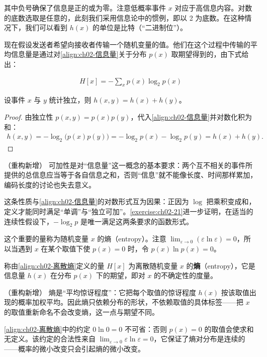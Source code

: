 \documentclass[../../main.tex]{subfiles}
\begin{document}
其中负号确保了信息是正的或为零。注意低概率事件 $x$ 对应于高信息内容。对数的底数选取是任意的，此刻我们采用信息论中的惯例，即以 2 为底数。在这种情况下，我们可以看到 $h(x)$ 的单位是比特（“二进制位”）。

现在假设发送者希望向接收者传输一个随机变量的值。他们在这个过程中传输的平均信息量是通过对\eqref{align:ch02-信息量}关于分布 $p(x)$ 取期望得到的，由下式给出：

\begin{align}
  H[x] = -\sum_{x} p(x)\log_2 p(x)
  \label{align:ch02-离散熵}
\end{align}

\begin{proposition}[独立事件的信息量可加]\label{proposition:ch02-信息量可加}
设事件 $x$ 与 $y$ 统计独立，则 $h(x,y)=h(x)+h(y)$。
\end{proposition}

\begin{proof}
由独立性 $p(x,y)=p(x)p(y)$，代入\eqref{align:ch02-信息量}并对数化积为和：
\begin{align*}
  h(x,y) = -\log_2\big(p(x)p(y)\big) = -\log_2p(x) - \log_2p(y) = h(x)+h(y) .
\end{align*}
\end{proof}

\begin{remark}（重构新增）
可加性是对“信息量”这一概念的基本要求：两个互不相关的事件所提供的总信息应当等于各自信息之和，否则“信息”就不能像长度、时间那样累加，编码长度的讨论也失去意义。

这条性质与\eqref{align:ch02-信息量}的对数形式互为因果：正因为 $\log$ 把乘积变成和，定义才能同时满足“单调”与“独立可加”。\cref{exercise:ch02-21}进一步证明，在适当的连续性假设下，$-\log_2p$ 是唯一满足这两条要求的函数形式。
\end{remark}

这个重要的量称为随机变量 $x$ 的熵（entropy）。注意 $\lim_{\varepsilon\to0}(\varepsilon\ln\varepsilon)=0$，所以当遇到 $x$ 在某个取值下使 $p(x)=0$ 时，令 $p(x)\ln p(x)=0$。

\begin{definition}[熵]\label{definition:ch02-熵}
称由\eqref{align:ch02-离散熵}定义的量 $H[x]$ 为离散随机变量 $x$ 的\textbf{熵}（entropy），它是信息量 $h(x)$ 在分布 $p(x)$ 下的期望，即对 $x$ 的不确定性的度量。
\end{definition}

\begin{remark}（重构新增）
熵是“平均惊讶程度”：它把每个取值的惊讶程度 $h(x)$ 按该取值出现的概率加权平均。因此熵只依赖分布的形状，不依赖取值的具体标签——把 $x$ 的取值重新命名不会改变熵，这一点与期望不同。

\eqref{align:ch02-离散熵}中的约定 $0\ln0=0$ 不可省：否则 $p(x)=0$ 的取值会使求和无定义。该约定的合法性来自 $\lim_{\varepsilon\to0}\varepsilon\ln\varepsilon=0$，它保证了熵对分布是连续的——概率的微小改变只会引起熵的微小改变。
\end{remark}
\end{document}
